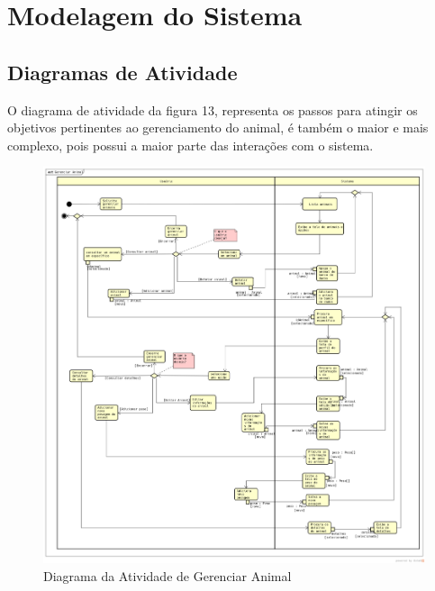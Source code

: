 \documentclass[12pt]{article}
\begin{document}
\begin{titlepage}
\begin{center}
\begin{figure}[!h]
\begin{center}

	\end{center}
\end{figure}

\newpage
\section{Modelagem do Sistema}

\subsection{Diagramas de Atividade}

O diagrama de atividade da figura 13, representa os passos para atingir os objetivos pertinentes ao gerenciamento do animal, é também o maior e mais complexo, pois possui a maior parte das interações com o sistema.

\begin{figure}[!h]
	\begin{center}
		\caption{Diagrama da Atividade de Gerenciar Animal}
		\includegraphics[width=6in]{img/atividadeanimal.png}

	\end{center}
\end{figure}


\end{center}
\end{titlepage}
\end{document}
